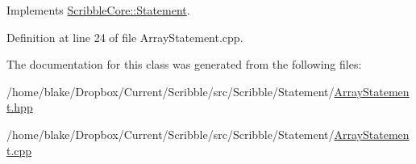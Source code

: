 Implements \hyperlink{class_scribble_core_1_1_statement_a532ed5a44ec49873dc191dae7ddc8b00}{Scribble\-Core\-::\-Statement}.



Definition at line 24 of file Array\-Statement.\-cpp.



The documentation for this class was generated from the following files\-:\begin{DoxyCompactItemize}
\item 
/home/blake/\-Dropbox/\-Current/\-Scribble/src/\-Scribble/\-Statement/\hyperlink{_array_statement_8hpp}{Array\-Statement.\-hpp}\item 
/home/blake/\-Dropbox/\-Current/\-Scribble/src/\-Scribble/\-Statement/\hyperlink{_array_statement_8cpp}{Array\-Statement.\-cpp}\end{DoxyCompactItemize}
